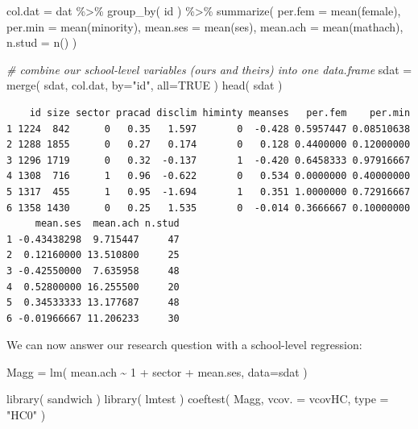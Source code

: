 \documentclass[
  letterpaper,
  DIV=11,
  numbers=noendperiod]{scrreprt}
\newenvironment{Shaded}{\begin{snugshade}}{\end{snugshade}}
\newcommand{\AttributeTok}[1]{\textcolor[rgb]{0.49,0.56,0.16}{#1}}
\newcommand{\CommentTok}[1]{\textcolor[rgb]{0.38,0.63,0.69}{\textit{#1}}}
\newcommand{\ConstantTok}[1]{\textcolor[rgb]{0.53,0.00,0.00}{#1}}
\newcommand{\DecValTok}[1]{\textcolor[rgb]{0.25,0.63,0.44}{#1}}
\newcommand{\FunctionTok}[1]{\textcolor[rgb]{0.02,0.16,0.49}{#1}}
\newcommand{\NormalTok}[1]{\textcolor[rgb]{0.00,0.44,0.13}{#1}}
\newcommand{\OtherTok}[1]{\textcolor[rgb]{0.00,0.44,0.13}{#1}}
\newcommand{\SpecialCharTok}[1]{\textcolor[rgb]{0.25,0.44,0.63}{#1}}
\newcommand{\StringTok}[1]{\textcolor[rgb]{0.25,0.44,0.63}{#1}}
\begin{document}
\begin{Shaded}
\begin{Highlighting}[]
\NormalTok{col.dat }\OtherTok{=}\NormalTok{ dat }\SpecialCharTok{\%\textgreater{}\%} \FunctionTok{group\_by}\NormalTok{( id ) }\SpecialCharTok{\%\textgreater{}\%} 
    \FunctionTok{summarize}\NormalTok{( }\AttributeTok{per.fem =} \FunctionTok{mean}\NormalTok{(female),}
                 \AttributeTok{per.min =} \FunctionTok{mean}\NormalTok{(minority),}
                 \AttributeTok{mean.ses =} \FunctionTok{mean}\NormalTok{(ses),}
                 \AttributeTok{mean.ach =} \FunctionTok{mean}\NormalTok{(mathach),}
                 \AttributeTok{n.stud =} \FunctionTok{n}\NormalTok{() )}

\CommentTok{\# combine our school{-}level variables (ours and theirs) into one data.frame}
\NormalTok{sdat }\OtherTok{=} \FunctionTok{merge}\NormalTok{( sdat, col.dat, }\AttributeTok{by=}\StringTok{"id"}\NormalTok{, }\AttributeTok{all=}\ConstantTok{TRUE}\NormalTok{ )}
\FunctionTok{head}\NormalTok{( sdat )}
\end{Highlighting}
\end{Shaded}

\begin{verbatim}
    id size sector pracad disclim himinty meanses   per.fem    per.min
1 1224  842      0   0.35   1.597       0  -0.428 0.5957447 0.08510638
2 1288 1855      0   0.27   0.174       0   0.128 0.4400000 0.12000000
3 1296 1719      0   0.32  -0.137       1  -0.420 0.6458333 0.97916667
4 1308  716      1   0.96  -0.622       0   0.534 0.0000000 0.40000000
5 1317  455      1   0.95  -1.694       1   0.351 1.0000000 0.72916667
6 1358 1430      0   0.25   1.535       0  -0.014 0.3666667 0.10000000
     mean.ses  mean.ach n.stud
1 -0.43438298  9.715447     47
2  0.12160000 13.510800     25
3 -0.42550000  7.635958     48
4  0.52800000 16.255500     20
5  0.34533333 13.177687     48
6 -0.01966667 11.206233     30
\end{verbatim}

We can now answer our research question with a school-level regression:

\begin{Shaded}
\begin{Highlighting}[]
\NormalTok{Magg }\OtherTok{=} \FunctionTok{lm}\NormalTok{( mean.ach }\SpecialCharTok{\textasciitilde{}} \DecValTok{1} \SpecialCharTok{+}\NormalTok{ sector }\SpecialCharTok{+}\NormalTok{ mean.ses, }\AttributeTok{data=}\NormalTok{sdat )}

\FunctionTok{library}\NormalTok{( sandwich )}
\FunctionTok{library}\NormalTok{( lmtest )}
\FunctionTok{coeftest}\NormalTok{( Magg, }\AttributeTok{vcov. =}\NormalTok{ vcovHC, }\AttributeTok{type =} \StringTok{"HC0"}\NormalTok{ )}
\end{Highlighting}
\end{Shaded}
\end{document}
